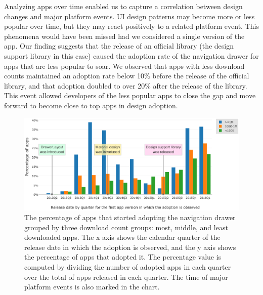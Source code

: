 Analyzing apps over time enabled us to capture a correlation between design changes and major platform events.
UI design patterns may become more or less popular over time, but they may react positively to a related platform event.
This phenomena would have been missed had we considered a single version of the app.
Our finding suggests that the release of an official library (the design support library in this case) caused the adoption rate of the navigation drawer for apps that are less popular to soar.
We observed that apps with less download counts maintained an adoption rate below 10\% before the release of the official library, and that adoption doubled to over 20\% after the release of the library.
This event allowed developers of the less popular apps to close the gap and move forward to become close to top apps in design adoption.
\begin{figure}[H]
	\includegraphics[scale=0.5]{figures/findings/navdrawer_by_quarter_grouped_by_downloads.png}
	\caption{The percentage of apps that started adopting the navigation drawer grouped by three download count groups: most, middle, and least downloaded apps. The x axis shows the calendar quarter of the release date in which the adoption is observed, and the y axis shows the percentage of apps that adopted it. The percentage value is computed by dividing the number of adopted apps in each quarter over the total of apps released in each quarter. The time of major platform events is also marked in the chart.}
	\label{fig:navdrawer_quarter_download}
\end{figure}

